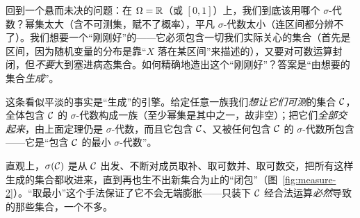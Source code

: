 回到一个悬而未决的问题：在 $\Omega=\mathbb{R}$（或 $[0,1]$）上，我们到底该用哪个 $\sigma$-代数？幂集太大（含不可测集，赋不了概率），平凡 $\sigma$-代数太小（连区间都分辨不了）。我们想要一个``刚刚好''的——它必须包含一切我们实际关心的集合（首先是区间，因为随机变量的分布是靠``$X$ 落在某区间''来描述的），又要对可数运算封闭，但\emph{不要}大到塞进病态集合。如何精确地造出这个``刚刚好''？答案是``由想要的集合\emph{生成}''。


这条看似平淡的事实是``生成''的引擎。给定任意一族我们\emph{想让它们可测}的集合 $\mathcal{C}$，全体包含 $\mathcal{C}$ 的 $\sigma$-代数构成一族（至少幂集是其中之一，故非空）；把它们\emph{全部交起来}，由上面定理仍是 $\sigma$-代数，而且它包含 $\mathcal{C}$、又被任何包含 $\mathcal{C}$ 的 $\sigma$-代数所包含——它是``包含 $\mathcal{C}$ 的最小 $\sigma$-代数''。


直观上，$\sigma(\mathcal{C})$ 是从 $\mathcal{C}$ 出发、不断对成员取补、取可数并、取可数交，把所有这样生成的集合都收进来，直到再也生不出新集合为止的``闭包''（图~\ref{fig:measure-2}）。``取最小''这个手法保证了它不会无端膨胀——只装下 $\mathcal{C}$ 经合法运算\emph{必然}导致的那些集合，一个不多。

